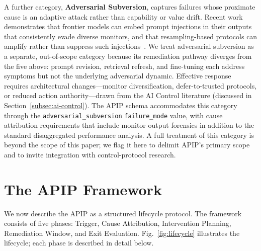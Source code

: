 \documentclass[conference]{IEEEtran}
\begin{document}
A further category, \textbf{Adversarial Subversion}, captures failures whose
proximate cause is an adaptive attack rather than capability or value drift.
Recent work demonstrates that frontier models can embed prompt injections in
their outputs that consistently evade diverse monitors, and that
resampling-based protocols can amplify rather than suppress such
injections~\cite{schoen2025stress,bhatt2025ctrlz}. We treat adversarial
subversion as a separate, out-of-scope category because its remediation
pathway diverges from the five above: prompt revision, retrieval refresh, and
fine-tuning each address
symptoms but not the underlying adversarial dynamic. Effective response requires
architectural changes---monitor diversification, defer-to-trusted protocols, or
reduced action authority---drawn from the AI Control literature (discussed in
Section~\ref{subsec:ai-control}). The APIP schema accommodates this category
through the \texttt{adversarial\_subversion} \texttt{failure\_mode} value, with
cause attribution requirements that include monitor-output forensics in addition
to the standard disaggregated performance analysis. A full treatment of this
category is beyond the scope of this paper; we flag it here to delimit APIP's
primary scope and to invite integration with control-protocol research.
\section{The APIP Framework}
\label{sec:framework}

We now describe the APIP as a structured lifecycle protocol. The framework
consists of five phases: Trigger, Cause Attribution, Intervention Planning,
Remediation Window, and Exit Evaluation. Fig.~\ref{fig:lifecycle} illustrates
the lifecycle; each phase is described in detail below.
\end{document}
